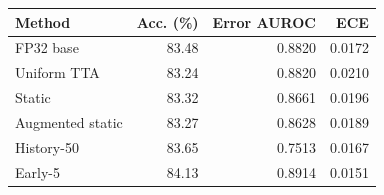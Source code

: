\begin{tabular}{lrrr}
\toprule
Method & Acc. (\%) & Error AUROC & ECE \\
\midrule
FP32 base & 83.48 & 0.8820 & 0.0172 \\
Uniform TTA & 83.24 & 0.8820 & 0.0210 \\
Static & 83.32 & 0.8661 & 0.0196 \\
Augmented static & 83.27 & 0.8628 & 0.0189 \\
History-50 & 83.65 & 0.7513 & 0.0167 \\
Early-5 & 84.13 & 0.8914 & 0.0151 \\
\bottomrule
\end{tabular}
